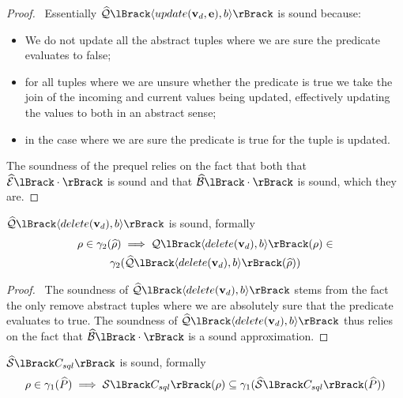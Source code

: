 \begin{proof}
    \pfsketch\
    Essentially $\abssqlsem{\langle update(\absattrs, \absexps), b \rangle}$ is sound because:
    \begin{itemize}
        \item We do not update all the abstract tuples where we are sure the predicate evaluates to false;
        \item for all tuples where we are unsure whether the predicate is true we take the join of the incoming and current values being updated, effectively updating the values to both in an abstract sense;
        \item in the case where we are sure the predicate is true for the tuple is updated.
    \end{itemize}
    The soundness of the prequel relies on the fact that both that $\absexpsem{\cdot}$ is sound and that $\absboolsem{\cdot}$ is sound, which they are.
\end{proof}


\begin{conjecture}
    \label{thm:sound-delete}
    $\abssqlsem{\langle delete(\absattrs), b \rangle}$ is sound, formally
    \begin{multline*}
        \environment \in \concrete_2(\ab{\environment}) \implies \sqlsem{\langle delete(\absattrs), b \rangle}(\environment) \in \\
        \concrete_2(\abssqlsem{\langle delete(\absattrs), b \rangle}(\ab{\environment}))
    \end{multline*}
\end{conjecture}


\begin{proof}
    \pfsketch\
    The soundness of $\abssqlsem{\langle delete(\absattrs), b \rangle}$ stems from the fact the only remove abstract tuples where we are absolutely sure that the predicate evaluates to true.
    The soundness of $\abssqlsem{\langle delete(\absattrs), b \rangle}$ thus relies on the fact that $\absboolsem{\cdot}$ is a sound approximation.
\end{proof}


\begin{conjecture}
    \label{thm:sound-sql}
    $\abssem{C_{sql}}$ is sound, formally
    \begin{equation*}
    \environment \in \concrete_1(\ab{P}) \implies \sem{C_{sql}}(\environment) \subseteq \concrete_1(\abssem{C_{sql}}(\ab{P}))
    \end{equation*}
\end{conjecture}


